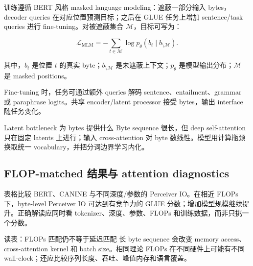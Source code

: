 训练遵循 BERT 风格 masked language modeling：遮蔽一部分输入 bytes，decoder queries 在对应位置预测目标；之后在 GLUE 任务上增加 sentence/task queries 进行 fine-tuning。对被遮蔽集合 $\mathcal{M}$，目标可写为：

\[
\mathcal{L}_{\text{MLM}}=-\sum_{t\in\mathcal{M}}\log p_\theta(b_t\mid b_{\setminus\mathcal{M}}).
\]

其中，$b_t$ 是位置 $t$ 的真实 byte；$b_{\setminus\mathcal{M}}$ 是未遮蔽上下文；$p_\theta$ 是模型输出分布；$\mathcal{M}$ 是 masked positions。


Fine-tuning 时，任务可通过额外 queries 解码 sentence、entailment、grammar 或 paraphrase logits。共享 encoder/latent processor 接受 bytes，输出 interface 随任务变化。


\begin{importantbox}{Latent bottleneck 为 bytes 提供什么}
Byte sequence 很长，但 deep self-attention 只在固定 latents 上进行；输入 cross-attention 对 byte 数线性。模型用计算瓶颈换取统一 vocabulary，并把分词边界学习内化。
\end{importantbox}

\subsection{FLOP-matched 结果与 attention diagnostics}

表格比较 BERT、CANINE 与不同深度/参数的 Perceiver IO。在相近 FLOPs 下，byte-level Perceiver IO 可达到有竞争力的 GLUE 分数；增加模型规模继续提升。正确解读应同时看 tokenizer、深度、参数、FLOPs 和训练数据，而非只挑一个分数。


\begin{knowledgebox}{读表：FLOPs 匹配仍不等于延迟匹配}
长 byte sequence 会改变 memory access、cross-attention kernel 和 batch size。相同理论 FLOPs 在不同硬件上可能有不同 wall-clock；还应比较序列长度、吞吐、峰值内存和语言覆盖。
\end{knowledgebox}

